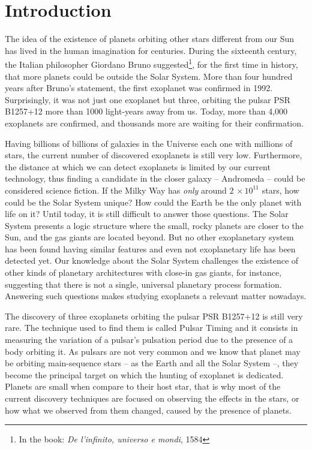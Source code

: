 \chapter{Introduction}\label{chap:intro}
The idea of the existence of planets orbiting other stars different from our Sun has lived in the human imagination for centuries. During the sixteenth century, the Italian philosopher Giordano Bruno suggested\footnote{In the book: \textit{De l'infinito, universo e mondi}, 1584}, for the first time in history, that more planets could be outside the Solar System. More than four hundred years after Bruno's statement, the first exoplanet was confirmed in 1992. Surprisingly, it was not just one exoplanet but three, orbiting the pulsar PSR B1257+12 more than 1000 light-years away from us. Today, more than 4,000 exoplanets are confirmed, and thousands more are waiting for their confirmation.


Having billions of billions of galaxies in the Universe each one with millions of stars, the current number of discovered exoplanets is still very low. Furthermore, the distance at which we can detect exoplanets is limited by our current technology, thus finding a candidate in the closer galaxy -- Andromeda -- could be considered science fiction. If the Milky Way has \textit{only} around $2\,\times10^{11}$ stars, how could be the Solar System unique? How could the Earth be the only planet with life on it? Until today, it is still difficult to answer those questions. The Solar System presents a logic structure where the small, rocky planets are closer to the Sun, and the gas giants are located beyond. But no other exoplanetary system has been found having similar features and even not exoplanetary life has been detected yet. Our knowledge about the Solar System challenges the existence of other kinds of planetary architectures with close-in gas giants, for instance, suggesting that there is not a single, universal planetary process formation. Answering such questions makes studying exoplanets a relevant matter nowadays.

The discovery of three exoplanets orbiting the pulsar PSR B1257+12 is still very rare. The technique used to find them is called Pulsar Timing and it consists in measuring the variation of a pulsar's pulsation period due to the presence of a body orbiting it. As pulsars are not very common and we know that planet may be orbiting main-sequence stars -- as the Earth and all the Solar System --, they become the principal target on which the hunting of exoplanet is dedicated. Planets are small when compare to their host star, that is why most of the current discovery techniques are focused on observing the effects in the stars, or how what we observed from them changed, caused by the presence of planets. 

